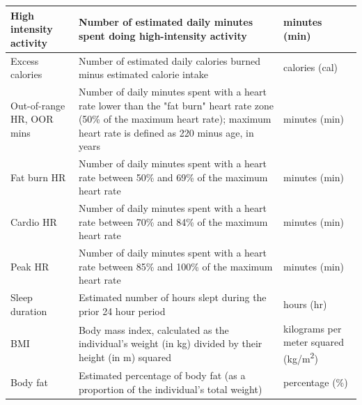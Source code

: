 \documentclass[10pt]{article}
\begin{document}
\begin{table}[]
{\begin{tabular}{p{1.5in}p{4in}p{1.5in}}
  \hline
High intensity activity & Number of estimated daily minutes spent doing high-intensity activity                                                                                                                & minutes (min)                            \\
  \hline
Excess calories         & Number of estimated daily calories burned minus estimated calorie intake                                                                                                             & calories (cal)                           \\
  \hline
Out-of-range HR, OOR mins         & Number of daily minutes spent with a heart rate lower than the "fat burn" heart rate zone (50\% of the maximum heart rate); maximum heart rate is defined as 220 minus age, in years & minutes (min)                            \\
  \hline
Fat burn HR             & Number of daily minutes spent with a heart rate between 50\% and 69\% of the maximum heart rate                                                                                      & minutes (min)                            \\
  \hline
Cardio HR               & Number of daily minutes spent with a heart rate between 70\% and 84\% of the maximum heart rate                                                                                      & minutes (min)                            \\
  \hline
Peak HR                 & Number of daily minutes spent with a heart rate between 85\% and 100\% of the maximum heart rate                                                                                     & minutes (min)                            \\
  \hline
Sleep duration          & Estimated number of hours slept during the prior 24 hour period                                                                                                                      & hours (hr)                               \\
  \hline
BMI                     & Body mass index, calculated as the
                          individual's weight (in kg) divided by their
                          height (in m) squared
  & kilograms per meter squared (kg/m\textsuperscript{2}) \\
  \hline
Body fat                & Estimated percentage of body fat (as a proportion of the individual's total weight)                                                                                                  & percentage (\%)                          \\

\end{tabular}}
\end{table}
\end{document}
